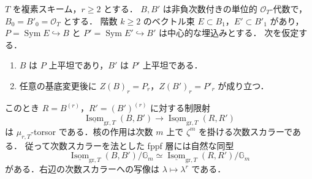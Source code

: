 \begin{theorem}
\label{thm:ncdp-veronese-lift}
$T$ を複素スキーム，$r\ge2$ とする．
$B,B'$ は非負次数付きの単位的 $\mathcal O_T$-代数で，
$B_0=B'_0=\mathcal O_T$ とする．
階数 $k\ge2$ のベクトル束 $E\subset B_1$，$E'\subset B'_1$ があり，
$P=\operatorname{Sym}E\hookrightarrow B$ と
$P'=\operatorname{Sym}E'\hookrightarrow B'$ は中心的な埋込みとする．
次を仮定する．
\begin{enumerate}
\item $B$ は $P$ 上平坦であり，$B'$ は $P'$ 上平坦である．
\item 任意の基底変更後に $Z(B)_r=P_r$，$Z(B')_r=P'_r$ が成り立つ．
\end{enumerate}
このとき $R=B^{(r)}$，$R'=(B')^{(r)}$ に対する制限射
\[
 \underline{\operatorname{Isom}}_{\mathrm{gr},T}(B,B')
 \longrightarrow
 \underline{\operatorname{Isom}}_{\mathrm{gr},T}(R,R')
\]
は $\mu_{r,T}$-torsor である．核の作用は次数 $m$ 上で
$\zeta^m$ を掛ける次数スカラーである．
従って次数スカラーを法とした fppf 層には自然な同型
\[
 \underline{\operatorname{Isom}}_{\mathrm{gr},T}(B,B')/\mathbb G_m
 \simeq
 \underline{\operatorname{Isom}}_{\mathrm{gr},T}(R,R')/\mathbb G_m
\]
がある．右辺の次数スカラーへの写像は $\lambda\mapsto\lambda^r$ である．
\end{theorem}
